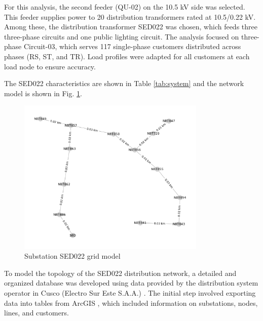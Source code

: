 \documentclass[12pt, 3p]{elsarticle}
\begin{document}
For this analysis, the second feeder (QU-02) on the 10.5 kV 
side was selected. This feeder supplies power to 20 distribution 
transformers rated at 10.5/0.22 kV. Among these, the distribution 
transformer SED022 was chosen, which feeds three three-phase 
circuits and one public lighting circuit. The analysis focused 
on three-phase Circuit-03, which serves 117 single-phase customers 
distributed across phases (RS, ST, and TR). Load profiles were 
adapted for all customers at each load node to ensure accuracy.

The SED022 characteristics are shown in Table \ref{tab:system}
and the network model is shown in Fig. \ref{fig:network}.

\begin{table}[ht]
    \centering
    \caption{System Characteristics}
    \label{tab:system}
\end{table}

\begin{figure}[!ht]
    \centering
    \includegraphics[width=0.8\textwidth]{./Figures/network.png}
    \caption{Substation SED022 grid model}
    \label{fig:network}
\end{figure}

To model the topology of the SED022 distribution network, 
a detailed and organized database was developed using data 
provided by the distribution system operator in Cusco 
(Electro Sur Este S.A.A.) \cite{ElectroSurEste}. The initial step 
involved exporting data into tables from ArcGIS \cite{ArcGIS10.3}, 
which included information on substations, nodes, lines, and 
customers. 
\end{document}
